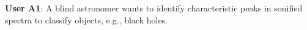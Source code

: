 { \bf User A1}: A blind astronomer wants to identify characteristic peaks in sonified spectra to classify objects, e.g., black holes. 
